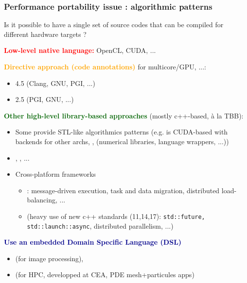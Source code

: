 \begin{frame}
  \frametitle{Performance portability issue : algorithmic patterns}

  \begin{itemize}
  \item Is it possible to have a single set of source codes that can be compiled for different hardware targets ?
  \item \textcolor{red}{\textbf{Low-level native language:}} OpenCL, CUDA, ...
  \item \textcolor{orange}{\textbf{Directive approach (code annotations)}} for multicore/GPU, ...: 
    \begin{itemize}
    \item {} 4.5 (Clang, GNU, PGI, ...)
    \item {} 2.5 (PGI, GNU, ...)
    \end{itemize}
  \item \textcolor{darkgreen}{\textbf{Other high-level library-based approaches}} (mostly c++-based, à la TBB):
    \begin{itemize}
    \item Some provide STL-like algorithmics patterns (e.g.  is CUDA-based with backends for other archs, ,  (numerical libraries, language wrappers, ...))
    \item {}, , ...
    \item Cross-platform frameworks
      \begin{itemize}
      \item {}: message-driven execution, task and data migration, distributed load-balancing, ...
      \item {} (heavy use of new c++ standards (11,14,17): \texttt{std::future, std::launch::async}, distributed parallelism, ...) 
      \end{itemize}
    \end{itemize}
  {\small \item \textcolor{darkblue}{\textbf{Use an embedded Domain Specific Language (DSL)}}
    \begin{itemize}
    \item {} (for image processing),
    \item {} (for HPC, developped at CEA, PDE mesh+particules apps)
    \end{itemize}}
  \end{itemize}
  
\end{frame}


